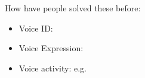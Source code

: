 How have people solved these before:
\begin{itemize}
\item Voice ID:%
\item Voice Expression: %
\item Voice activity: e.g. %
\end{itemize}
      
